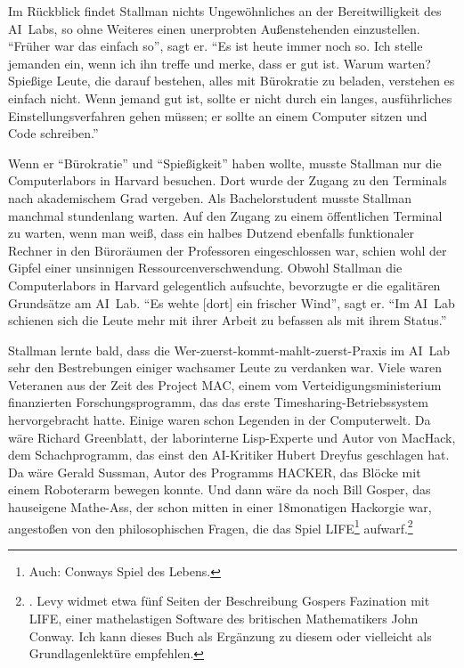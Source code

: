 Im Rückblick findet Stallman nichts Ungewöhnliches an der Bereitwilligkeit des AI~Labs, so ohne Weiteres einen unerprobten Außenstehenden einzustellen. "`Früher war das einfach so"', sagt er. "`Es ist heute immer noch so. Ich stelle jemanden ein, wenn ich ihn treffe und merke, dass er gut ist. Warum warten? Spießige Leute, die darauf bestehen, alles mit Bürokratie zu beladen, verstehen es einfach nicht. Wenn jemand gut ist, sollte er nicht durch ein langes, ausführliches Einstellungsverfahren gehen müssen; er sollte an einem Computer sitzen und Code schreiben."'

Wenn er "`Bürokratie"' und "`Spießigkeit"' haben wollte, musste Stallman nur die Computerlabors in Harvard besuchen. Dort wurde der Zugang zu den Terminals nach akademischem Grad vergeben. Als Bachelorstudent musste Stallman manchmal stundenlang warten. Auf den Zugang zu einem öffentlichen Terminal zu warten, wenn man weiß, dass ein halbes Dutzend ebenfalls funktionaler Rechner in den Büroräumen der Professoren eingeschlossen war, schien wohl der Gipfel einer unsinnigen Ressourcenverschwendung. Obwohl Stallman die Computerlabors in Harvard gelegentlich aufsuchte, bevorzugte er die egalitären Grundsätze am AI~Lab. "`Es wehte [dort] ein frischer Wind"', sagt er. "`Im AI~Lab schienen sich die Leute mehr mit ihrer Arbeit zu befassen als mit ihrem Status."'

Stallman lernte bald, dass die Wer-zuerst-kommt-mahlt-zuerst-Praxis im AI~Lab sehr den Bestrebungen einiger wachsamer Leute zu verdanken war. Viele waren Veteranen aus der Zeit des Project MAC, einem vom Verteidigungsministerium finanzierten Forschungsprogramm, das das erste Timesharing-Betriebssystem hervorgebracht hatte. Einige waren schon Legenden in der Computerwelt. Da wäre Richard Greenblatt, der laborinterne Lisp-Experte und Autor von MacHack, dem Schachprogramm, das einst den AI-Kritiker Hubert Dreyfus geschlagen hat. Da wäre Gerald Sussman, Autor des Programms HACKER, das Blöcke mit einem Roboterarm bewegen konnte. Und dann wäre da noch Bill Gosper, das hauseigene Mathe-Ass, der schon mitten in einer 18monatigen Hackorgie war, angestoßen von den philosophischen Fragen, die das Spiel LIFE\footnote{Auch: Conways Spiel des Lebens.} aufwarf.\footnote{\cite[Vgl.][S.\,144]{hackers}. Levy widmet etwa fünf Seiten der Beschreibung Gospers Fazination mit LIFE, einer mathelastigen Software des britischen Mathematikers John Conway. Ich kann dieses Buch als Ergänzung zu diesem oder vielleicht als Grundlagenlektüre empfehlen.}

